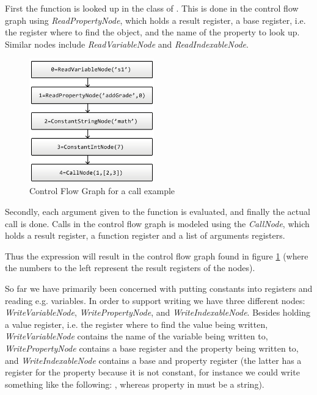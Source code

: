 First the function  is looked up in the class of . This is done in the control flow graph using \textit{ReadPropertyNode}, 
which holds a result register, a base register, i.e. the register where to find the object, and the name of the property to look up. 
Similar nodes include \textit{ReadVariableNode} and \textit{ReadIndexableNode}.

\begin{figure}
	\vspace{-20pt}
	\begin{center}
		\includegraphics[width=0.48\textwidth]{images/Call-example.png}
	\end{center}
	\vspace{-10pt}
	\caption{Control Flow Graph for a call example}
	\label{fig:callCfg}
	\vspace{-10pt}
\end{figure}
Secondly, each argument given to the function is evaluated, and finally the actual call is done. 
Calls in the control flow graph is modeled using the \textit{CallNode}, which holds a result register, 
a function register and a list of arguments registers.

Thus the expression  will result in the control flow graph found in figure \ref{fig:callCfg} 
(where the numbers to the left represent the result registers of the nodes).

So far we have primarily been concerned with putting constants into registers and reading e.g. variables. 
In order to support writing we have three different nodes: \textit{WriteVariableNode}, \textit{WritePropertyNode}, 
and \textit{WriteIndexableNode}. Besides holding a value register, i.e. the register where to find the value being written, 
\textit{WriteVariableNode} contains the name of the variable being written to, 
\textit{WritePropertyNode} contains a base register and the property being written to, 
and \textit{WriteIndexableNode} contains a base and property register (the latter has a register for the property because it is not constant, 
for instance we could write something like the following: , 
whereas property in  must be a string).

